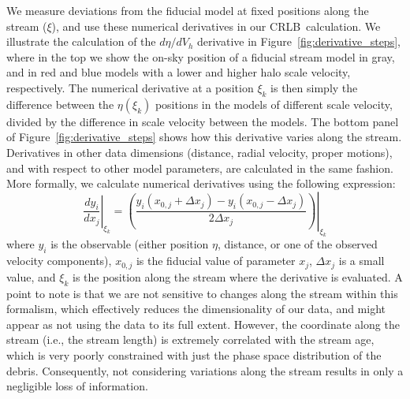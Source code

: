 \documentclass[modern]{aastex61}
\newcommand{\acronym}[1]{{\small{#1}}}
\newcommand{\CRLB}{\acronym{CRLB}}
\begin{document}
We measure deviations from the fiducial model at fixed positions along the stream ($\xi$), and use these numerical derivatives in our \CRLB\ calculation.
We illustrate the calculation of the $d\eta/d V_h$ derivative in Figure~\ref{fig:derivative_steps}, where in the top we show the on-sky position of a fiducial stream model in gray, and in red and blue models with a lower and higher halo scale velocity, respectively.
The numerical derivative at a position $\xi_k$ is then simply the difference between the $\eta(\xi_k)$ positions in the models of different scale velocity, divided by the difference in scale velocity between the models.
The bottom panel of Figure~\ref{fig:derivative_steps} shows how this derivative varies along the stream.
Derivatives in other data dimensions (distance, radial velocity, proper motions), and with respect to other model parameters, are calculated in the same fashion.
More formally, we calculate numerical derivatives using the following expression:
\begin{equation}
\left.\frac{d y_i}{d x_j}\right\rvert_{\xi_k} = \left.\left(\frac{y_i(x_{0,j} + \Delta x_j) - y_i(x_{0,j} - \Delta x_j)}{2\Delta x_j}\right)\right\rvert_{\xi_k}
\label{eq:derivative}
\end{equation}
where $y_i$ is the observable (either position $\eta$, distance, or one of the observed velocity components), $x_{0,j}$ is the fiducial value of parameter $x_j$, $\Delta x_j$ is a small value, and $\xi_k$ is the position along the stream where the derivative is evaluated.
A point to note is that we are not sensitive to changes along the stream within this formalism, which effectively reduces the dimensionality of our data, and might appear as not using the data to its full extent.
However, the coordinate along the stream (i.e., the stream length) is extremely correlated with the stream age, which is very poorly constrained with just the phase space distribution of the debris.
Consequently, not considering variations along the stream results in only a negligible loss of information.
\end{document}
